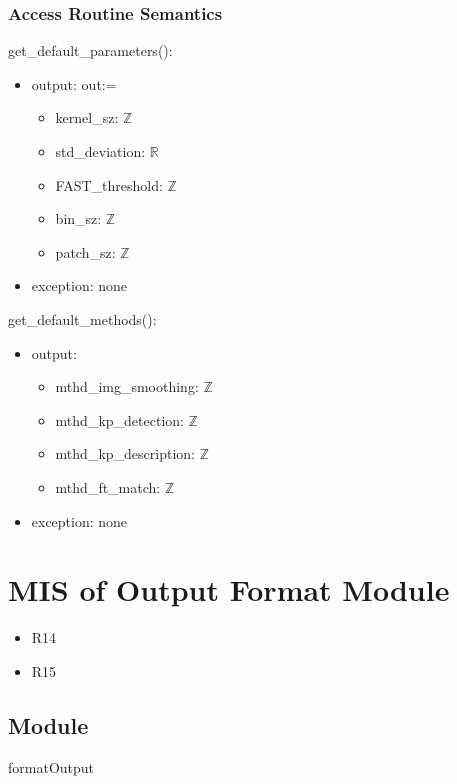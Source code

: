 \documentclass[12pt, titlepage]{article}
\begin{document}
\subsubsection{Access Routine Semantics}
\noindent get\_default\_parameters():
\begin{itemize}
\item output: out:= 
  \begin{itemize}
  \item kernel\_sz: $\mathbb{Z}$
  \item std\_deviation: $\mathbb{R}$ 
  \item FAST\_threshold: $\mathbb{Z}$ 
  \item bin\_sz: $\mathbb{Z}$ 
  \item patch\_sz: $\mathbb{Z}$ 
  \end{itemize}
  \item exception: none  
\end{itemize}

\noindent get\_default\_methods():
\begin{itemize}
\item output:
  \begin{itemize}
    \item mthd\_img\_smoothing: $\mathbb{Z}$
    \item mthd\_kp\_detection: $\mathbb{Z}$ 
    \item mthd\_kp\_description: $\mathbb{Z}$
    \item mthd\_ft\_match: $\mathbb{Z}$
  \end{itemize}
  \item exception: none 
\end{itemize}



\section{MIS of Output Format Module} \label{mOF}
\begin{itemize}
  \item R14
  \item R15
\end{itemize}

\subsection{Module}

formatOutput
\end{document}
